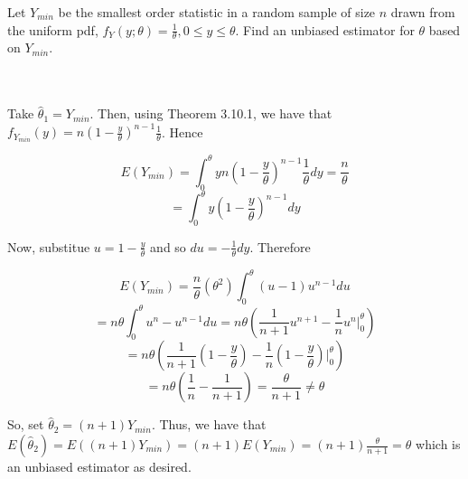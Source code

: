 Let $Y_{min}$ be the smallest order statistic in a random sample of size $n$ drawn from the uniform pdf,
$f_Y (y;\theta)=\frac{1}{\theta}, 0\leq y\leq\theta$. Find an unbiased estimator for $\theta$ based on
$Y_{min}$.\\\\

\begin{solution}\renewcommand{\qedsymbol}{}\ \\
    Take $\hat{\theta}_1=Y_{min}$. Then, using Theorem 3.10.1, we have that
    $f_{Y_{min}}(y)=n(1-\frac{y}{\theta})^{n-1}\frac{1}{\theta}$. Hence
    
    $$E(Y_{min})=\int_0^{\theta}yn(1-\frac{y}{\theta})^{n-1}\frac{1}{\theta}dy=\frac{n}{\theta}$$
    $$=\int_0^{\theta}y(1-\frac{y}{\theta})^{n-1}dy$$
    
    Now, substitue $u=1-\frac{y}{\theta}$ and so $du=-\frac{1}{\theta}dy$. Therefore
    
    $$E(Y_{min})=\frac{n}{\theta}(\theta^2)\int_0^{\theta}(u-1)u^{n-1}du$$
    $$=n\theta\int_0^{\theta}u^n-u^{n-1}du=n\theta(\frac{1}{n+1}u^{n+1}-\frac1nu^n|_0^{\theta})$$
    $$=n\theta(\frac{1}{n+1}(1-\frac{y}{\theta})-\frac1n(1-\frac{y}{\theta})|_0^{\theta})$$
    $$=n\theta(\frac1n-\frac{1}{n+1})=\frac{\theta}{n+1}\neq\theta$$
    
    So, set $\hat{\theta}_2=(n+1)Y_{min}$. Thus, we have that
    $E(\hat{\theta}_2)=E((n+1)Y_{min})=(n+1)E(Y_{min})=(n+1)\frac{\theta}{n+1}=\theta$ which is an
    unbiased estimator as desired.

\end{solution}